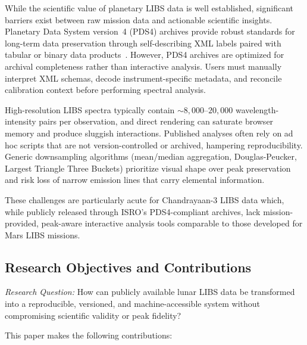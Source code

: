 \documentclass[11pt,a4paper]{article}
\begin{document}
While the scientific value of planetary LIBS data is well established, significant barriers exist between raw mission data and actionable scientific insights. Planetary Data System version~4 (PDS4) archives provide robust standards for long-term data preservation through self-describing XML labels paired with tabular or binary data products~\cite{Hughes2018}. However, PDS4 archives are optimized for archival completeness rather than interactive analysis. Users must manually interpret XML schemas, decode instrument-specific metadata, and reconcile calibration context before performing spectral analysis.

High-resolution LIBS spectra typically contain $\sim 8{,}000$--$20{,}000$ wavelength-intensity pairs per observation, and direct rendering can saturate browser memory and produce sluggish interactions. Published analyses often rely on ad hoc scripts that are not version-controlled or archived, hampering reproducibility. Generic downsampling algorithms (mean/median aggregation, Douglas-Peucker, Largest Triangle Three Buckets) prioritize visual shape over peak preservation and risk loss of narrow emission lines that carry elemental information.

These challenges are particularly acute for Chandrayaan-3 LIBS data which, while publicly released through ISRO's PDS4-compliant archives, lack mission-provided, peak-aware interactive analysis tools comparable to those developed for Mars LIBS missions.

\subsection{Research Objectives and Contributions}

\textit{Research Question:} How can publicly available lunar LIBS data be transformed into a reproducible, versioned, and machine-accessible system without compromising scientific validity or peak fidelity?

This paper makes the following contributions:
\end{document}
